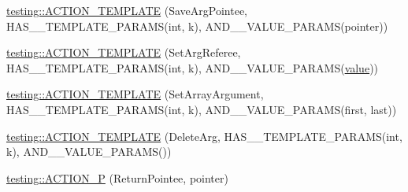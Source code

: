 \begin{DoxyCompactItemize}
\item 
\mbox{\hyperlink{namespacetesting_a31565a90ad7f08c1a88e4b138957172c}{testing\+::\+A\+C\+T\+I\+O\+N\+\_\+\+T\+E\+M\+P\+L\+A\+TE}} (Save\+Arg\+Pointee, H\+A\+S\+\_\+\_\+\+T\+E\+M\+P\+L\+A\+T\+E\+\_\+\+P\+A\+R\+A\+MS(int, k), A\+N\+D\+\_\+\_\+\+V\+A\+L\+U\+E\+\_\+\+P\+A\+R\+A\+MS(pointer))
\item 
\mbox{\hyperlink{namespacetesting_adfd3c9538285d257370f955aa81488f1}{testing\+::\+A\+C\+T\+I\+O\+N\+\_\+\+T\+E\+M\+P\+L\+A\+TE}} (Set\+Arg\+Referee, H\+A\+S\+\_\+\_\+\+T\+E\+M\+P\+L\+A\+T\+E\+\_\+\+P\+A\+R\+A\+MS(int, k), A\+N\+D\+\_\+\_\+\+V\+A\+L\+U\+E\+\_\+\+P\+A\+R\+A\+MS(\mbox{\hyperlink{_obj__test_2lib_2googletest-master_2googlemock_2test_2gmock-matchers__test_8cc_a337b8a670efc0b086ad3af163f3121b6}{value}}))
\item 
\mbox{\hyperlink{namespacetesting_a2b0f090219db3bb0630d5ce6f7d911d8}{testing\+::\+A\+C\+T\+I\+O\+N\+\_\+\+T\+E\+M\+P\+L\+A\+TE}} (Set\+Array\+Argument, H\+A\+S\+\_\+\_\+\+T\+E\+M\+P\+L\+A\+T\+E\+\_\+\+P\+A\+R\+A\+MS(int, k), A\+N\+D\+\_\+\_\+\+V\+A\+L\+U\+E\+\_\+\+P\+A\+R\+A\+MS(first, last))
\item 
\mbox{\hyperlink{namespacetesting_a37a5ebfe68fd8dedf8bd82a5ebddcb7b}{testing\+::\+A\+C\+T\+I\+O\+N\+\_\+\+T\+E\+M\+P\+L\+A\+TE}} (Delete\+Arg, H\+A\+S\+\_\+\_\+\+T\+E\+M\+P\+L\+A\+T\+E\+\_\+\+P\+A\+R\+A\+MS(int, k), A\+N\+D\+\_\+\_\+\+V\+A\+L\+U\+E\+\_\+\+P\+A\+R\+A\+MS())
\item 
\mbox{\hyperlink{namespacetesting_a3d58f0d746946064154cd257d368599d}{testing\+::\+A\+C\+T\+I\+O\+N\+\_\+P}} (Return\+Pointee, pointer)
\end{DoxyCompactItemize}
